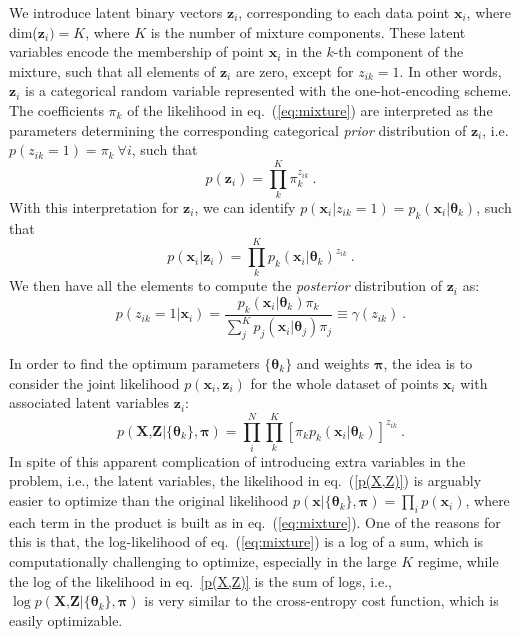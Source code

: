 \documentclass[12pt, a4paper]{article}
\newcommand{\bx}{\textbf{x}}
\newcommand{\btheta}{\boldsymbol{\theta}}
\begin{document}
We introduce latent binary vectors $\textbf{z}_i$, corresponding to each data point $\bx_i$, where dim($\textbf{z}_i)=K$, where $K$ is the number of mixture components. These latent variables encode the membership of point $\bx_i$ in the $k$-th component of the mixture, such that all elements of $\textbf{z}_i$ are zero, except for $z_{ik}=1$. In other words, $\textbf{z}_i$ is a categorical random variable represented with the one-hot-encoding scheme. The coefficients $\pi_k$ of the likelihood in eq.~(\ref{eq:mixture}) are interpreted as the parameters determining the corresponding categorical \textit{prior} distribution of $\textbf{z}_i$, i.e. $p(z_{ik}=1)=\pi_k~\forall i$, such that  
\begin{equation}
 p(\textbf{z}_i) = \prod_k^K \pi_k^{z_{ik}} ~.  
\end{equation}
With this interpretation for $\textbf{z}_i$, we can identify $ p(\bx_i | z_{ik}=1) = p_k(\bx_i|\btheta_k)$, such that
\begin{equation}
p(\bx_i|\textbf{z}_i) = \prod_k^K p_k(\bx_i|\btheta_k)^{z_{ik}}~.
\end{equation}
We then have all the elements to compute the \textit{posterior} distribution of $\textbf{z}_i$ as:
\begin{equation}
p(z_{ik}=1 | \bx_i) = \frac{p_k(\bx_i|\btheta_k) \pi_k}
{\sum_j^K p_j(\bx_i|\btheta_j) \pi_j} \equiv \gamma(z_{ik})~.
\label{gamma}
\end{equation}

In order to find the optimum parameters $\{\btheta_k\}$ and weights $\boldsymbol{\pi}$, the idea is to consider the joint likelihood $p(\bx_i, \textbf{z}_i)$ 
for the whole dataset of points $\bx_i$ with associated latent variables $\textbf{z}_i$:
\begin{equation}
\label{p(X,Z)}
p(\textbf{X,Z}|\{\btheta_k\},\boldsymbol{\pi})
=\prod_i^N \prod_k^K [\pi_k p_k(\bx_i|\btheta_k)]^{z_{ik}}~.
\end{equation}
In spite of this apparent complication of introducing extra variables in the problem, i.e., the latent variables, the likelihood in eq.~(\ref{p(X,Z)}) is arguably easier to optimize than the original likelihood $p(\bx|\{\btheta_k\},\boldsymbol{\pi}) = \prod_i p(\bx_i)$, where each term in the product is built as in eq.~(\ref{eq:mixture}). One of the reasons for this is that, the log-likelihood of eq.~(\ref{eq:mixture}) is a log of a sum, which is computationally challenging to optimize, especially in the large $K$ regime, while the log of the likelihood in eq.~\ref{p(X,Z)} is the sum of logs, i.e., $\log p(\textbf{X,Z}|\{\btheta_k\},\boldsymbol{\pi})$ is very similar to the cross-entropy cost function, which is easily optimizable.  
\end{document}
